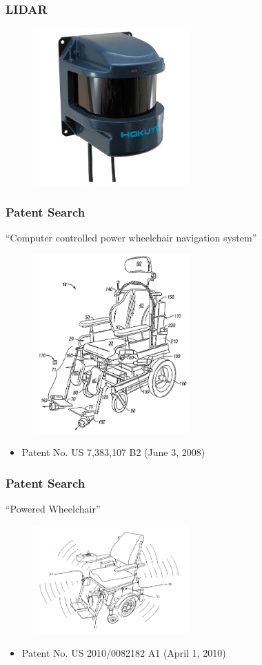 \documentclass{beamer}
\begin{document}
\begin{frame}
  \frametitle{LIDAR}
  \begin{figure}
    \centering
    \includegraphics[width=6cm]{laser.jpg}
  \end{figure}
\end{frame}

\begin{frame}
  \frametitle{Patent Search}
  ``Computer controlled power wheelchair navigation system''
  \begin{figure}
    \centering
    \includegraphics[width=6cm]{patents.png}
  \end{figure}
  \begin{itemize}
    \item Patent No. US 7,383,107 B2 (June 3, 2008) \\
  \end{itemize}
\end{frame}

\begin{frame}
  \frametitle{Patent Search}
  ``Powered Wheelchair''
  \begin{figure}
    \centering
    \includegraphics[width=6cm]{patents2.png}
  \end{figure}
  \begin{itemize}
    \item Patent No. US 2010/0082182 A1 (April 1, 2010) \\
  \end{itemize}
\end{frame}
\end{document}
